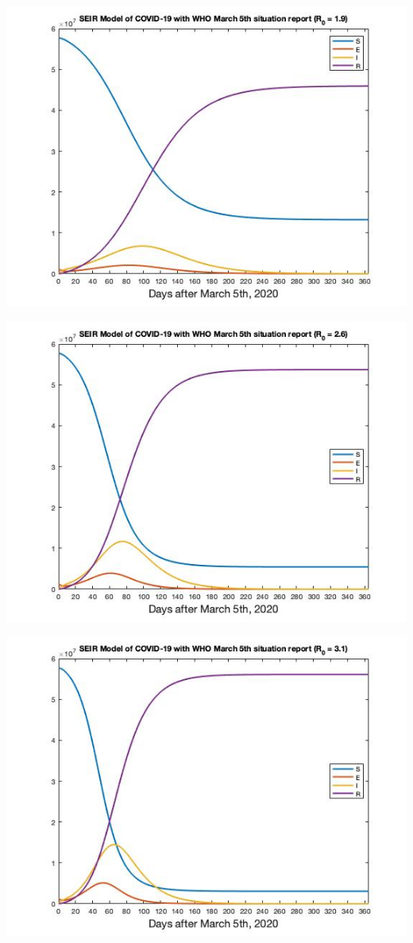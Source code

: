 \documentclass[12pt, a4paper]{article}
\begin{document}
    \includegraphics[scale=0.75]{plots/whoseir19.jpg}
    
    \includegraphics[scale=0.75]{plots/whoseir26.jpg}
    
    \includegraphics[scale=0.75]{plots/whoseir31.jpg}
        
\end{document}
